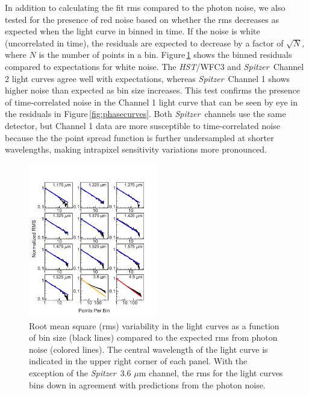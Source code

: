 \documentclass[twocolumn]{aastex61}
\newcommand{\project}[1]{\textsl{#1}}
\newcommand{\HST}{\project{HST}}
\newcommand{\Spitzer}{\project{Spitzer}}
\begin{document}

In addition to calculating the fit rms compared to the photon noise, we also tested for the presence of red noise based on whether the rms decreases as expected when the light curve in binned in time.  If the noise is white (uncorrelated in time), the residuals are expected to decrease by a factor of $\sqrt{N}$, where $N$ is the number of points in a bin. Figure\,\ref{fig:rms} shows the binned residuals compared to expectations for white noise. The \HST/WFC3 and \Spitzer\ Channel 2 light curves agree well with expectations, whereas \Spitzer\ Channel 1 shows higher noise than expected as bin size increases. This test confirms the presence of time-correlated noise in the Channel 1 light curve that can be seen by eye in the residuals in Figure\,\ref{fig:phasecurves}. Both \Spitzer\ channels use the same detector, but Channel 1 data are more susceptible to time-correlated noise because the the point spread function is further undersampled at shorter wavelengths, making intrapixel sensitivity variations more pronounced.


\begin{figure}
\includegraphics[width = 0.5\textwidth]{Figures/rms.pdf}
\caption{Root mean square (rms) variability in the light curves as a function of bin size (black lines) compared to the expected rms from photon noise (colored lines). The central wavelength of the light curve is indicated in the upper right corner of each panel. With the exception of the \Spitzer\ 3.6 $\mu$m channel, the rms for the light curves bins down in agreement with predictions from the photon noise.}
\label{fig:rms}
\end{figure}
\end{document}
